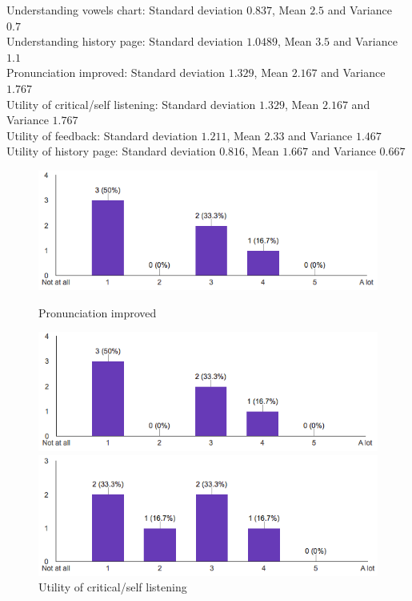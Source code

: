 \noindent Understanding vowels chart: Standard deviation $0.837$, Mean $2.5$ and Variance $0.7$ \\
\noindent Understanding history page: Standard deviation $1.0489$, Mean $3.5$ and Variance $1.1$ \\
\noindent Pronunciation improved: Standard deviation $1.329$, Mean $2.167$ and Variance $1.767$ \\
\noindent Utility of critical/self listening: Standard deviation $1.329$, Mean $2.167$ and Variance $1.767$ \\
\noindent Utility of feedback: Standard deviation $1.211$, Mean $2.33$ and Variance $1.467$ \\
\noindent Utility of history page: Standard deviation $0.816$, Mean $1.667$ and Variance $0.667$

\begin{figure}[!ht]
	\centering
	\begin{minipage}{.5\textwidth}
		\centering
		\includegraphics[scale=0.5]{Figures/responses/application_improved_pronunciation.png}
		\caption{Pronunciation improved}
		\label{fig:int_improving_lang}
	\end{minipage}%
	\begin{minipage}{.5\textwidth}
		\centering
		\includegraphics[scale=0.5]{Figures/responses/utility_of_listening.png}
		\caption{Utility of critical/self listening}
		\label{fig:int_learnign_lang}
	\end{minipage}
	\begin{minipage}{.5\textwidth}
		\centering
		\includegraphics[scale=0.5]{Figures/responses/application_rate_feedback.png}

\end{minipage}
\end{figure}
